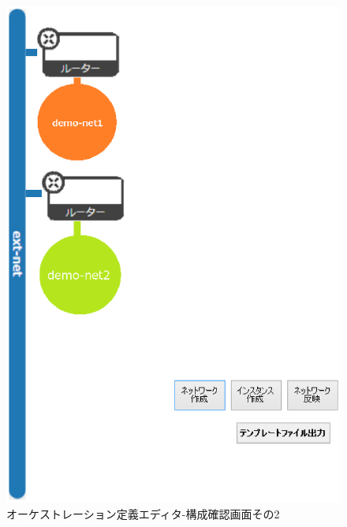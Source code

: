 \documentclass[mingoth]{kut-paper}		%
\begin{document}
		\begin{figure}[H]
			\begin{center}
				\includegraphics[scale=0.5]{Document/構成確認画面2.eps}
				\caption{オーケストレーション定義エディタ-構成確認画面その2}
				\label{pic:2}
			\end{center}
		\end{figure}
		
\end{document}
